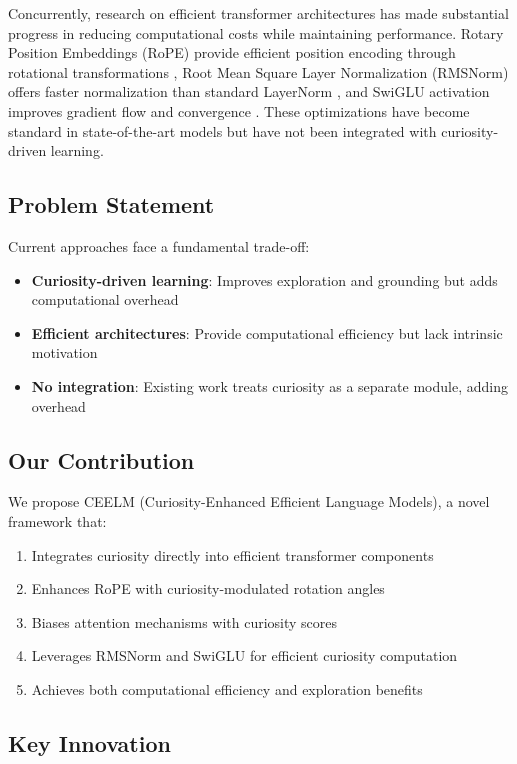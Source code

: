\documentclass{IEEEtran}
\begin{document}
Concurrently, research on efficient transformer architectures has made substantial progress in reducing computational costs while maintaining performance. Rotary Position Embeddings (RoPE) provide efficient position encoding through rotational transformations \cite{su2021}, Root Mean Square Layer Normalization (RMSNorm) offers faster normalization than standard LayerNorm \cite{zhang2019}, and SwiGLU activation improves gradient flow and convergence \cite{shazeer2020}. These optimizations have become standard in state-of-the-art models but have not been integrated with curiosity-driven learning.

\subsection{Problem Statement}

Current approaches face a fundamental trade-off:
\begin{itemize}
    \item \textbf{Curiosity-driven learning}: Improves exploration and grounding but adds computational overhead
    \item \textbf{Efficient architectures}: Provide computational efficiency but lack intrinsic motivation
    \item \textbf{No integration}: Existing work treats curiosity as a separate module, adding overhead
\end{itemize}

\subsection{Our Contribution}

We propose CEELM (Curiosity-Enhanced Efficient Language Models), a novel framework that:
\begin{enumerate}
    \item Integrates curiosity directly into efficient transformer components
    \item Enhances RoPE with curiosity-modulated rotation angles
    \item Biases attention mechanisms with curiosity scores
    \item Leverages RMSNorm and SwiGLU for efficient curiosity computation
    \item Achieves both computational efficiency and exploration benefits
\end{enumerate}

\subsection{Key Innovation}
\end{document}
